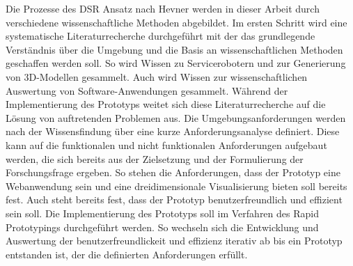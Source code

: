 Die Prozesse des \ac{DSR} Ansatz nach Hevner werden in dieser Arbeit durch verschiedene wissenschaftliche Methoden abgebildet. Im ersten Schritt wird eine systematische Literaturrecherche durchgeführt mit der das grundlegende Verständnis über die Umgebung und die Basis an wissenschaftlichen Methoden geschaffen werden soll. So wird Wissen zu Servicerobotern und zur Generierung von 3D-Modellen gesammelt. Auch wird Wissen zur wissenschaftlichen Auswertung von Software-Anwendungen gesammelt. Während der Implementierung des Prototyps weitet sich diese Literaturrecherche auf die Lösung von auftretenden Problemen aus. Die Umgebungsanforderungen werden nach der Wissensfindung über eine kurze Anforderungsanalyse definiert. Diese kann auf die funktionalen und nicht funktionalen Anforderungen aufgebaut werden, die sich bereits aus der Zielsetzung und der Formulierung der Forschungsfrage ergeben. So stehen die Anforderungen, dass der Prototyp eine Webanwendung sein und eine dreidimensionale Visualisierung bieten soll bereits fest. Auch steht bereits fest, dass der Prototyp benutzerfreundlich und effizient sein soll. Die Implementierung des Prototyps soll im Verfahren des Rapid Prototypings durchgeführt werden. So wechseln sich die Entwicklung und Auswertung der benutzerfreundlickeit und effizienz iterativ ab bis ein Prototyp entstanden ist, der die definierten Anforderungen erfüllt.
